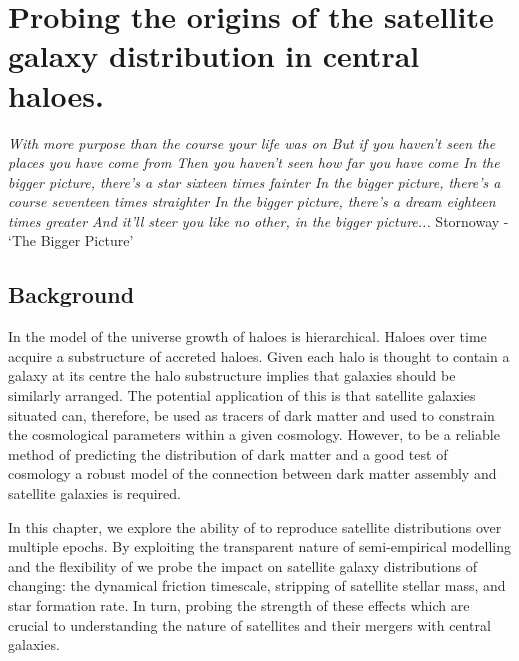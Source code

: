 
\chapter{Probing the origins of the satellite galaxy distribution in central haloes.} 
\label{Chapter:GalDist}
\begin{center}
    \textit{With more purpose than the course your life was on \newline
    But if you haven't seen the places you have come from\newline
    Then you haven't seen how far you have come\newline
    In the bigger picture, there's a star sixteen times fainter\newline
    In the bigger picture, there's a course seventeen times straighter\newline
    In the bigger picture, there's a dream eighteen times greater\newline
    And it'll steer you like no other, in the bigger picture...\newline}
Stornoway - `The Bigger Picture'
\end{center}


\section{Background}
In the \LCDM model of the universe growth of haloes is hierarchical. Haloes over time acquire a substructure of accreted haloes. Given each halo is thought to contain a galaxy at its centre the halo substructure implies that galaxies should be similarly arranged. The potential application of this is that satellite galaxies situated can, therefore, be used as tracers of dark matter and used to constrain the cosmological parameters within a given \LCDM cosmology. However, to be a reliable method of predicting the distribution of dark matter and a good test of \LCDM cosmology a robust model of the connection between dark matter assembly and satellite galaxies is required.

In this chapter, we explore the ability of \steel to reproduce satellite distributions over multiple epochs. By exploiting the transparent nature of semi-empirical modelling and the flexibility of \steel we probe the impact on satellite galaxy distributions of changing: the dynamical friction timescale, stripping of satellite stellar mass, and star formation rate. In turn, probing the strength of these effects which are crucial to understanding the nature of satellites and their mergers with central galaxies.  

